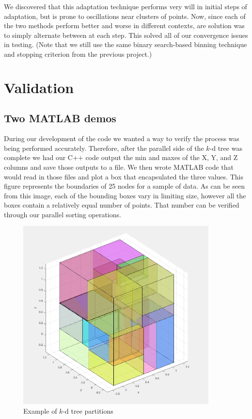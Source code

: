 \documentclass{article}
\begin{document}
We discovered that this adaptation technique performs very will in initial steps of adaptation, but is prone to oscillations near clusters of points. Now, since each of the two methods perform better and worse in different contexts, are solution was to simply alternate between at each step. This solved all of our convergence issues in testing. (Note that we still use the same binary search-based binning technique and stopping criterion from the previous project.)





\section{Validation}


\subsection{Two MATLAB demos}
During our development of the code we wanted a way to verify the process was being performed accurately. Therefore, after the parallel side of the $k$-d tree was complete we had our C++ code output the min and maxes of the X, Y, and Z columns and save those outputs to a file. We then wrote MATLAB code that would read in those files and plot a box that encapsulated the three values. This figure represents the boundaries of 25 nodes for a sample of data. As can be seen from this image, each of the bounding boxes vary in limiting size, however all the boxes contain a relatively equal number of points. That number can be verified through our parallel sorting operations. 

\begin{figure}
\includegraphics[width=0.9\textwidth]{images/squares.png}
\caption{Example of $k$-d tree partitions}
\end{figure}
\end{document}
